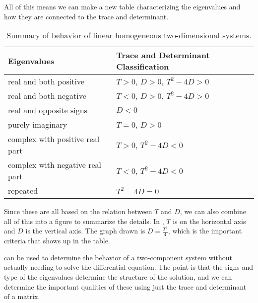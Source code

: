 \documentclass{ximera}
\begin{document}
All of this means we can make a new table characterizing the eigenvalues and how they are connected to the trace and determinant. 

\begin{table}[h!t]
    \mybeginframe
    \capstart
    \begin{center}
        \begin{tabular}{@{}ll@{}}
            \toprule
            Eigenvalues & Trace and Determinant Classification \\
            \midrule
            real and both positive & $T > 0$, $D > 0$, $T^2 - 4D > 0$  \\
            real and both negative &  $T < 0$, $D > 0$, $T^2 - 4D > 0$\\
            real and opposite signs & $D < 0$ \\
            purely imaginary &  $T = 0$, $D > 0$\\
            complex with positive real part & $T > 0$, $T^2 - 4D < 0$  \\
            complex with negative real part &  $T < 0$, $T^2 - 4D < 0$ \\
            repeated & $T^2 - 4D = 0$ \\
            \bottomrule
        \end{tabular}
    \end{center}
    \caption{Summary of behavior of linear homogeneous two-dimensional systems.\label{pln:behtabTD}}
    \myendframe
\end{table}

Since these are all based on the relation between $T$ and $D$, we can also combine all of this into a figure to summarize the details. In , $T$ is on the horizontal axis and $D$ is the vertical axis. The graph drawn is $D = \frac{T^2}{4}$, which is the important criteria that shows up in the table. 

\begin{myfig}
    \capstart
    \caption{Trace-Determinant plane for analysis of two-component linear systems. \label{fig:TDPlaneAnalysis}}
\end{myfig}

 can be used to determine the behavior of a two-component system without actually needing to solve the differential equation. The point is that the signs and type of the eigenvalues determine the structure of the solution, and we can determine the important qualities of these using just the trace and determinant of a matrix.
\end{document}
